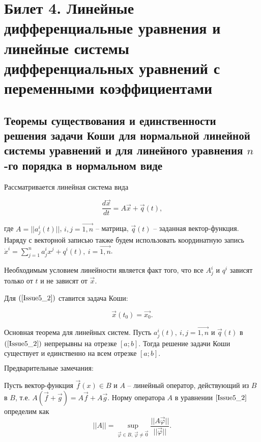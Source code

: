 \section{Билет 4. Линейные дифференциальные уравнения и линейные системы дифференциальных уравнений с переменными коэффициентами}

\subsection{Теоремы существования и единственности решения задачи Коши для нормальной линейной системы уравнений и
для линейного уравнения $n$-го порядка в нормальном виде}

Рассматривается линейная система вида

\begin{equation}
	\frac{d\overrightarrow{x}}{dt} = A\overrightarrow{x} + \overrightarrow{q}(t),
	\label{Issue5_2}
\end{equation}

где $A = ||a_j^i(t)||$, $i, j = \overrightarrow{1, n}$ -- матрица, $\overrightarrow{q}(t)$ -- заданная вектор-функция. Наряду с векторной записью также будем использовать координатную запись $\dot{x}^i = \sum\limits_{j = 1}^{n} a_j^i x^j + q^i(t),\ i = \overrightarrow{1, n}$.

$\textbf{Необходимым условием линейности}$ является факт того, что все $A_j^i$ и $q^i$ зависят только от $t$ и не зависят от $\overrightarrow{x}$.

Для $(\ref{Issue5_2})$ ставится задача Коши:

\[ \overrightarrow{x}(t_0) = \overrightarrow{x_0}.\]

\begin{theorem}

$\textbf{Основная теорема для линейных систем.}$ Пусть $a_j^i(t),\ i, j = \overrightarrow{1, n}$ и $\overrightarrow{q}(t)$ в $(\ref{Issue5_2})$ непрерывны на отрезке $[a;b]$. Тогда решение задачи Коши существует и единственно на всем отрезке $[a;b].$
\label{4_1_Cauchy}
\end{theorem}

$\textbf{Предварительные замечания:}$

Пусть вектор-функция $\overrightarrow{f}(x) \in B$ и $A$ -- линейный оператор, действующий из $B$ в $B$, т.е. $A(\overrightarrow{f} + \overrightarrow{g}) = A\overrightarrow{f} + A\overrightarrow{g}$.
Норму оператора $A$ в уравнении $\eqref{Issue5_2}$ определим как
\[ ||A|| =  \sup\limits_{\overrightarrow{\varphi} \in B,\ \overrightarrow{\varphi} \neq \overrightarrow{0}} \frac{||A\overrightarrow{\varphi}||}{||\overrightarrow{\varphi}||}. \]

